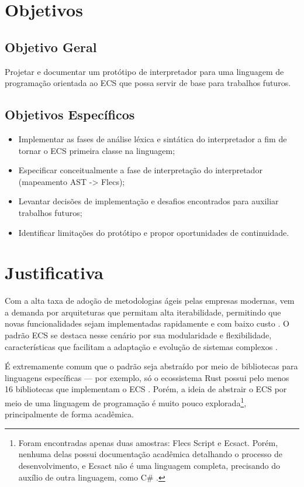 \section{Objetivos} \label{sec:objetivos}

\subsection{Objetivo Geral} \label{sec:obj_geral}

Projetar e documentar um protótipo de interpretador para uma linguagem de programação orientada ao ECS que possa servir de base para trabalhos futuros.

\subsection{Objetivos Específicos}

\begin{itemize}
    \item Implementar as fases de análise léxica e sintática do interpretador a fim de tornar o ECS primeira classe na linguagem;
    \item Especificar conceitualmente a fase de interpretação do interpretador (mapeamento AST -> Flecs);
    \item Levantar decisões de implementação e desafios encontrados para auxiliar trabalhos futuros;
    \item Identificar limitações do protótipo e propor oportunidades de continuidade.
\end{itemize}

\section{Justificativa} \label{sec:justificativa}

Com a alta taxa de adoção de metodologias ágeis pelas empresas modernas, vem a demanda por arquiteturas que permitam alta iterabilidade, permitindo que novas funcionalidades sejam implementadas rapidamente e com baixo custo \cite{17thstateofagile, agile}. O padrão ECS se destaca nesse cenário por sua modularidade e flexibilidade, características que facilitam a adaptação e evolução de sistemas complexos \cite{ecsfaq}.

É extremamente comum que o padrão seja abstraído por meio de bibliotecas para linguagens específicas — por exemplo, só o ecossistema Rust possui pelo menos 16 bibliotecas que implementam o ECS \cite{arewegameyet}. Porém, a ideia de abstrair o ECS por meio de uma linguagem de programação é muito pouco explorada\footnote{Foram encontradas apenas duas amostras: Flecs Script e Ecsact. Porém, nenhuma delas possui documentação acadêmica detalhando o processo de desenvolvimento, e Ecsact não é uma linguagem completa, precisando do auxílio de outra linguagem, como C\# \cite{flecsscript, ecsact}.}, principalmente de forma acadêmica.

